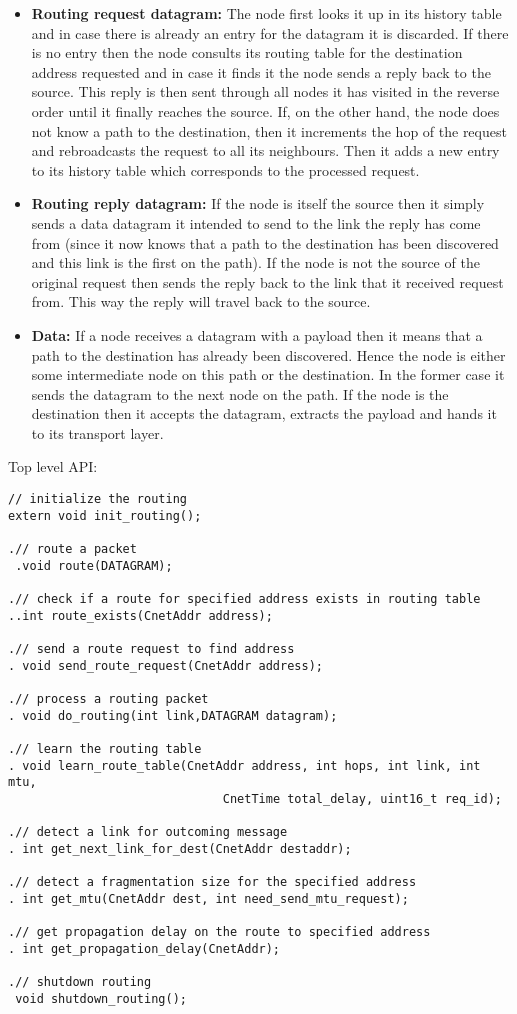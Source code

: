 \documentclass[11pt,a4paper,oneside]{report}
\begin{document}
\begin{itemize}
\item \noindent \textbf{Routing request datagram:}
The node first looks it up in its history table and in case there
is already an entry for the datagram it is discarded. If there is no entry then the node
consults its routing table for the destination address requested and in case it finds it
the node sends a reply back to the source. This reply is then sent through all nodes it
has visited in the reverse order until it finally reaches the source. If, on the other hand,
the node does not know a path to the destination, then it increments the hop of the request
and rebroadcasts the request to all its neighbours. Then it adds a new entry to its history
table which corresponds to the processed request.

\item \noindent \textbf{Routing reply datagram:}
  If the node is itself the source then it simply sends a data datagram it intended to send to the link
the reply has come from (since it now knows that a path to the destination has been discovered and
this link is the first on the path). If the node is not the source of the original request then
 sends the reply back to the link that it received request from. This way the reply will travel back to
the source.

\item \noindent \textbf{Data:}
  If a node receives a datagram with a payload then it means that a path to the destination has
already been discovered. Hence the node is either some intermediate node on this path or the
destination. In the former case it sends the datagram to the next node on the path. If the
node is the destination then it accepts the datagram, extracts the payload and hands it
to its transport layer.
\end{itemize}

    Top level API:
  \begin{lstlisting}
// initialize the routing
extern void init_routing();

.// route a packet
 .void route(DATAGRAM);

.// check if a route for specified address exists in routing table
..int route_exists(CnetAddr address);

.// send a route request to find address
. void send_route_request(CnetAddr address);

.// process a routing packet
. void do_routing(int link,DATAGRAM datagram);

.// learn the routing table
. void learn_route_table(CnetAddr address, int hops, int link, int mtu,
                              CnetTime total_delay, uint16_t req_id);

.// detect a link for outcoming message
. int get_next_link_for_dest(CnetAddr destaddr);

.// detect a fragmentation size for the specified address
. int get_mtu(CnetAddr dest, int need_send_mtu_request);

.// get propagation delay on the route to specified address
. int get_propagation_delay(CnetAddr);

.// shutdown routing
 void shutdown_routing();
  \end{lstlisting}
\newpage
\end{document}
